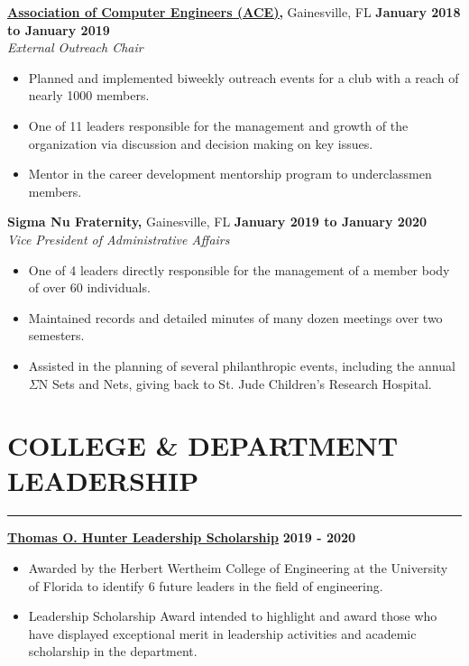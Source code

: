 \documentclass[11pt]{article} %
\begin{document}
		\noindent \href{https://uf-ace.com/}{\textbf{Association of Computer Engineers (ACE),}} Gainesville, FL \hfill\textbf{January 2018 to January 2019}\\
		\textit{External Outreach Chair}
		\begin{itemize}[noitemsep,nolistsep, label={-}]
			\item Planned and implemented biweekly outreach events for a club with a reach of nearly 1000 members.
			\item One of 11 leaders responsible for the management and growth of the organization via discussion and decision making on key issues.
			\item Mentor in the career development mentorship program to underclassmen members.
		\end{itemize}
		\vspace{.20cm}
		
		\noindent \textbf{Sigma Nu Fraternity,} Gainesville, FL \hfill\textbf{January 2019 to January 2020}\\
		\textit{Vice President of Administrative Affairs}
		\begin{itemize}[noitemsep,nolistsep, label={-}]
			\item One of 4 leaders directly responsible for the management of a member body of over 60 individuals.
			\item Maintained records and detailed minutes of many dozen meetings over two semesters.
			\item Assisted in the planning of several philanthropic events, including the annual $\Sigma$N Sets and Nets, giving back to St. Jude Children's Research Hospital.
		\end{itemize}
		\vspace{.20cm}
	
	\section*{COLLEGE \& DEPARTMENT LEADERSHIP}
	\hrule \relax
	\vspace{.4cm}
	
	\noindent\textbf{\href{https://www.eng.ufl.edu/leadership/students/scholarships/thomas-o-hunter-leadership/}{Thomas O. Hunter Leadership Scholarship}} \hfill\textbf{2019 - 2020}
	\begin{itemize}[noitemsep,nolistsep, label={-}]
		\item Awarded by the Herbert Wertheim College of Engineering at the University of Florida to identify 6 future leaders in the field of engineering.
		\item Leadership Scholarship Award intended to highlight and award those who have displayed exceptional merit in leadership activities and academic scholarship in the department.
	\end{itemize}
	\vspace{.20cm}
	
\end{document}
